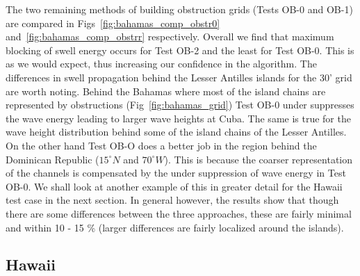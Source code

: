 \documentclass[12pt]{article}
\newcommand{\degree}{^{\circ}}
\newcounter{myfigno}[section]
\newenvironment{myfig}[1]{\begin{figure}[#1]
                        \refstepcounter{myfigno}}
                       {\end{figure}}
\newcommand{\myfcapc}[1]{\begin{center} \ff Fig. \themyfigno\ :~ #1
                        \end{center}}
\renewcommand{\themyfigno}{\thesection.\arabic{myfigno}}
\begin{document}
The two remaining methods of building obstruction grids (Tests OB-0 and OB-1) are compared in Figs~\ref{fig:bahamas_comp_obstr0} and~\ref{fig:bahamas_comp_obstrr} respectively. Overall we find that maximum blocking of swell energy occurs for Test OB-2 and the least for Test OB-0.  This is as we would expect, thus increasing our confidence in the algorithm. The differences in swell propagation behind the Lesser Antilles islands for the 30' grid are worth noting. Behind the Bahamas where most of the island chains are represented by obstructions (Fig~\ref{fig:bahamas_grid}) Test OB-0 under suppresses the wave energy leading to larger wave heights at Cuba. The same is true for the wave height distribution behind some of the island chains of the Lesser Antilles. On the other hand Test OB-O does a better job in the region behind the Dominican Republic ($15 \degree N$ and $70 \degree W$). This is because the coarser representation of the channels is compensated by the under suppression of wave energy in Test OB-0. We shall look at another example of this in greater detail for the Hawaii test case in the next section. In general however, the results show that though there are some differences between the three approaches, these are fairly minimal and within 10 - 15 \% (larger differences are fairly localized around the islands).  
 

\subsection{Hawaii}    
\end{document}
